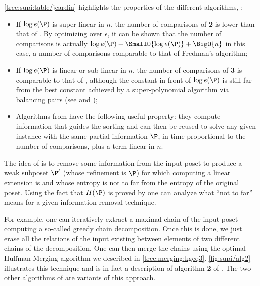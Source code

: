 \ref{tree:supi:table/jcardin} highlights the properties of the different
algorithms, \ie:

\begin{itemize}

\item If $\log e(\P)$ is super-linear in $n$, the number of comparisons of
\citet*{cardinal:2013} \textbf{2} is lower than that of \citet*{kahn:1995}. By
optimizing over $\epsilon$, it can be shown that the number of comparisons is
actually $\log e(\P) + \SmallO{\log e(\P)} + \BigO{n}$ in this case, a number of
comparisons comparable to that of Fredman’s algorithm;

\item If $\log e(\P)$ is linear or sub-linear in $n$, the number of comparisons
of \citet*{cardinal:2013} \textbf{3} is comparable to that of
\citet*{kahn:1995}, although the constant in front of $\log e(\P)$ is still far
from the best constant achieved by a super-polynomial algorithm via balancing
pairs (see \citet*{brightwell1995balancing} and
\citet*{brightwell1999balanced});

\item Algorithms from \citet*{cardinal:2013} have the following useful
property: they compute information that guides the sorting and can then be
reused to solve any given instance with the same partial information $\P$, in
time proportional to the number of comparisons, plus a term linear in $n$.

\end{itemize}

The idea of \citet*{cardinal:2013} is to remove some information from the input
poset to produce a weak subposet \(\P'\) (whose refinement is \(\P\)) for which
computing a linear extension is  and whose entropy is not to
far from the entropy of the original poset. Using the fact that \(H(\P)\) is
 proved by \citet*{kahn:1995} one can analyze what ``not to
far'' means for a given information removal technique.

For example, one can iteratively extract a maximal chain of the input poset
computing a so-called greedy chain decomposition. Once this is done, we just
erase all the relations of the input existing between elements of two different
chains of the decomposition. One can then merge the chains using the optimal
Huffman Merging algorithm we described in \ref{tree:merging:kgeq3}.
\ref{fig:supi/alg2} illustrates this technique and is in fact a description of
algorithm \textbf{2} of \citet{cardinal:2013}. The two other algorithms of
\citet*{cardinal:2013} are variants of this approach.

